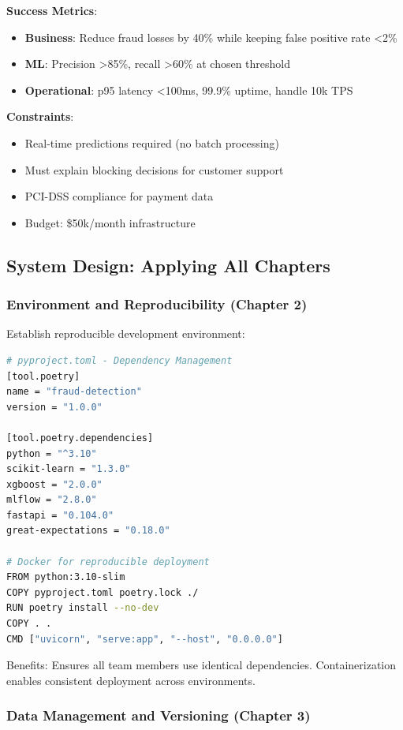 \textbf{Success Metrics}:
\begin{itemize}
    \item \textbf{Business}: Reduce fraud losses by 40\% while keeping false positive rate <2\%
    \item \textbf{ML}: Precision >85\%, recall >60\% at chosen threshold
    \item \textbf{Operational}: p95 latency <100ms, 99.9\% uptime, handle 10k TPS
\end{itemize}

\textbf{Constraints}:
\begin{itemize}
    \item Real-time predictions required (no batch processing)
    \item Must explain blocking decisions for customer support
    \item PCI-DSS compliance for payment data
    \item Budget: \$50k/month infrastructure
\end{itemize}

\subsection{System Design: Applying All Chapters}

\subsubsection{Environment and Reproducibility (Chapter 2)}

Establish reproducible development environment:

\begin{lstlisting}[language=bash, caption={Environment Setup}]
# pyproject.toml - Dependency Management
[tool.poetry]
name = "fraud-detection"
version = "1.0.0"

[tool.poetry.dependencies]
python = "^3.10"
scikit-learn = "1.3.0"
xgboost = "2.0.0"
mlflow = "2.8.0"
fastapi = "0.104.0"
great-expectations = "0.18.0"

# Docker for reproducible deployment
FROM python:3.10-slim
COPY pyproject.toml poetry.lock ./
RUN poetry install --no-dev
COPY . .
CMD ["uvicorn", "serve:app", "--host", "0.0.0.0"]
\end{lstlisting}

Benefits: Ensures all team members use identical dependencies. Containerization enables consistent deployment across environments.

\subsubsection{Data Management and Versioning (Chapter 3)}

